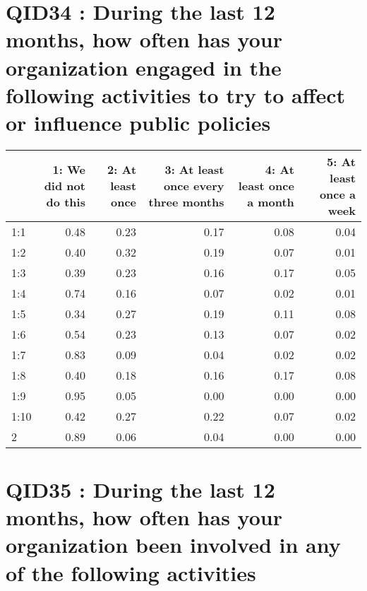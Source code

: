 \documentclass[]{article}
\begin{document}
\section{QID34 : During the last 12 months, how often has your
organization engaged in the following activities to try to affect or
influence public
policies}\label{qid34-during-the-last-12-months-how-often-has-your-organization-engaged-in-the-following-activities-to-try-to-affect-or-influence-public-policies}

\begin{table}[H]
\centering\begingroup\fontsize{30}{32}\selectfont

\begin{tabular}{l|r|r|r|r|r}
\hline
  & 1: We did not do this &  2: At least once &  3: At least once every three months &  4: At least once a month &  5: At least once a week\\
\hline
1:1 & 0.48 & 0.23 & 0.17 & 0.08 & 0.04\\
\hline
1:2 & 0.40 & 0.32 & 0.19 & 0.07 & 0.01\\
\hline
1:3 & 0.39 & 0.23 & 0.16 & 0.17 & 0.05\\
\hline
1:4 & 0.74 & 0.16 & 0.07 & 0.02 & 0.01\\
\hline
1:5 & 0.34 & 0.27 & 0.19 & 0.11 & 0.08\\
\hline
1:6 & 0.54 & 0.23 & 0.13 & 0.07 & 0.02\\
\hline
1:7 & 0.83 & 0.09 & 0.04 & 0.02 & 0.02\\
\hline
1:8 & 0.40 & 0.18 & 0.16 & 0.17 & 0.08\\
\hline
1:9 & 0.95 & 0.05 & 0.00 & 0.00 & 0.00\\
\hline
1:10 & 0.42 & 0.27 & 0.22 & 0.07 & 0.02\\
\hline
2 & 0.89 & 0.06 & 0.04 & 0.00 & 0.00\\
\hline
\end{tabular}
\endgroup{}
\end{table}

\section{QID35 : During the last 12 months, how often has your
organization been involved in any of the following
activities}\label{qid35-during-the-last-12-months-how-often-has-your-organization-been-involved-in-any-of-the-following-activities}
\end{document}
